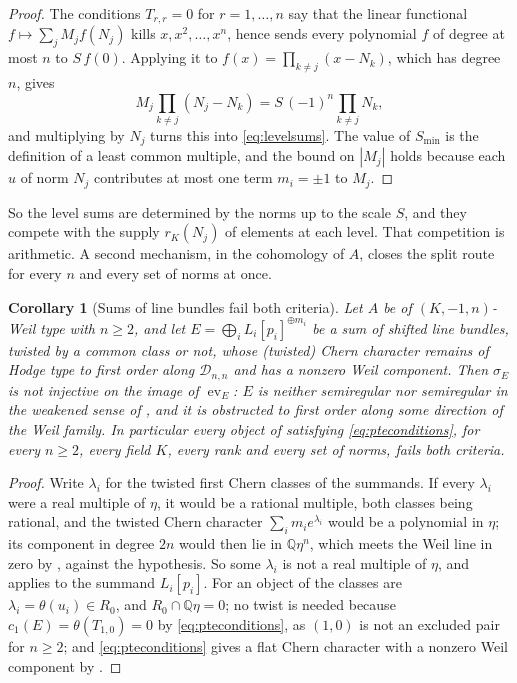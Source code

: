 \documentclass[11pt,reqno]{amsart}
\theoremstyle{plain}
\newtheorem{corollary}[theorem]{Corollary}
\theoremstyle{definition}
\theoremstyle{remark}
\newcommand{\QQ}{\mathbb{Q}}
\newcommand{\cD}{\mathcal{D}}
\begin{document}
\begin{proof}
The conditions $T_{r,r}=0$ for $r=1,\dots,n$ say that the linear
functional $f\mapsto\sum_{j}M_{j}f(N_{j})$ kills $x,x^{2},\dots,x^{n}$, hence
sends every polynomial $f$ of degree at most $n$ to $S\,f(0)$. Applying it to
$f(x)=\prod_{k\ne j}(x-N_{k})$, which has degree $n$, gives
\[
  M_{j}\prod_{k\ne j}(N_{j}-N_{k})=S\,(-1)^{n}\prod_{k\ne j}N_{k},
\]
and multiplying by $N_{j}$ turns this into \eqref{eq:levelsums}. The value of
$S_{\min}$ is the definition of a least common multiple, and the bound on
$|M_{j}|$ holds because each $u$ of norm $N_{j}$ contributes at most one term
$m_{i}=\pm1$ to $M_{j}$.
\end{proof}

So the level sums are determined by the norms up to the scale $S$, and they
compete with the supply $r_{K}(N_{j})$ of elements at each level. That
competition is arithmetic. A second mechanism, in the cohomology of $A$,
closes the split route for every $n$ and every set of norms at once.

\begin{corollary}[Sums of line bundles fail both criteria]\label{cor:noline}
Let $A$ be of $(K,-1,n)$-Weil type with $n\ge2$, and let
$E=\bigoplus_{i}L_{i}[p_{i}]^{\oplus m_{i}}$ be a sum of shifted line bundles,
twisted by a common class or not, whose (twisted) Chern character remains of
Hodge type to first order along $\cD_{n,n}$ and has a nonzero Weil component.
Then $\sigma_{E}$ is not injective on the image of $\operatorname{ev}_{E}$:
$E$ is neither semiregular nor semiregular in the weakened sense of
\cite[Question 11.4]{Mar25b}, and it is obstructed to first order along some
direction of the Weil family. In particular every object of 
satisfying \eqref{eq:pteconditions}, for every $n\ge2$, every field $K$,
every rank and every set of norms, fails both criteria.
\end{corollary}

\begin{proof}
Write $\lambda_{i}$ for the twisted first Chern classes of the summands. If
every $\lambda_{i}$ were a real multiple of $\eta$, it would be a rational
multiple, both classes being rational, and the twisted Chern character
$\sum_{i}m_{i}e^{\lambda_{i}}$ would be a polynomial in $\eta$; its component
in degree $2n$ would then lie in $\QQ\eta^{n}$, which meets the Weil line in
zero by \cite[Proposition~5.1]{paperI}, against the hypothesis. So some $\lambda_{i}$ is
not a real multiple of $\eta$, and \cite[Theorem~9.20]{paperI} applies to the
summand $L_{i}[p_{i}]$. For an object of  the classes are
$\lambda_{i}=\theta(u_{i})\in R_{0}$, and $R_{0}\cap\QQ\eta=0$; no twist is
needed because $c_{1}(E)=\theta(T_{1,0})=0$ by \eqref{eq:pteconditions}, as
$(1,0)$ is not an excluded pair for $n\ge2$; and \eqref{eq:pteconditions}
gives a flat Chern character with a nonzero Weil component by
.
\end{proof}
\end{document}
